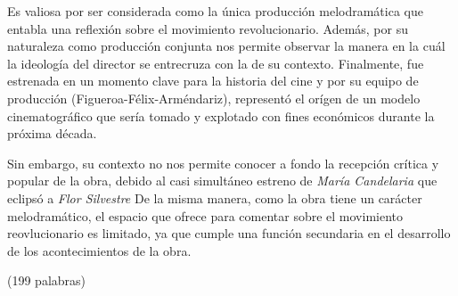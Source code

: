 Es valiosa por ser considerada como la única producción melodramática que
entabla una reflexión sobre el movimiento revolucionario. %
Además, por su naturaleza como producción conjunta nos permite observar la
manera en la cuál la ideología del director se entrecruza con la de su contexto. 
Finalmente, fue estrenada en un momento clave para la historia del cine
y por su equipo de producción (Figueroa-Félix-Arméndariz), representó el
orígen de un modelo cinematográfico que sería tomado y explotado con fines económicos durante la próxima década. %

Sin embargo, su contexto no nos permite conocer a fondo la recepción crítica y
popular de la obra, debido al casi simultáneo estreno de \textit{María
  Candelaria} que eclipsó  a \textit{Flor Silvestre} %
De la misma manera, como la obra tiene un carácter melodramático, el espacio que ofrece para comentar sobre el movimiento reovlucionario es limitado, ya que cumple una función secundaria en el desarrollo de los acontecimientos de la obra.
 
(199 palabras)
